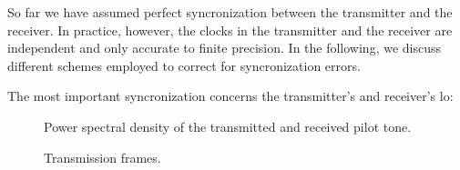 So far we have assumed perfect syncronization between the transmitter and the receiver.
In practice, however, the clocks in the transmitter and the receiver are independent and only accurate to finite precision.
In the following, we discuss different schemes employed to correct for syncronization errors.

The most important syncronization concerns the transmitter's and receiver's \gls{lo}:
\begin{figure}[htb]
	\centering
	
	\caption{Power spectral density of the transmitted and received pilot tone.}
\end{figure}

\begin{figure}[htb]
	\centering
	
	\caption{Transmission frames.}
\end{figure}
